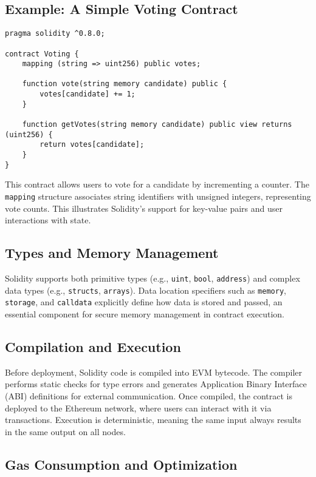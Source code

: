 \subsection*{Example: A Simple Voting Contract}
\begin{lstlisting}[language=Solidity, caption={A simple smart contract for voting system}, label={lst:voting_contract}, captionpos=b]
pragma solidity ^0.8.0;

contract Voting {
    mapping (string => uint256) public votes;

    function vote(string memory candidate) public {
        votes[candidate] += 1;
    }

    function getVotes(string memory candidate) public view returns (uint256) {
        return votes[candidate];
    }
}
\end{lstlisting}

This contract allows users to vote for a candidate by incrementing a counter. The \texttt{mapping} structure associates string identifiers with unsigned integers, representing vote counts. This illustrates Solidity's support for key-value pairs and user interactions with state.

\subsection*{Types and Memory Management}

Solidity supports both primitive types (e.g., \texttt{uint}, \texttt{bool}, \texttt{address}) and complex data types (e.g., \texttt{structs}, \texttt{arrays}). Data location specifiers such as \texttt{memory}, \texttt{storage}, and \texttt{calldata} explicitly define how data is stored and passed, an essential component for secure memory management in contract execution.

\subsection*{Compilation and Execution}

Before deployment, Solidity code is compiled into EVM bytecode. The compiler performs static checks for type errors and generates Application Binary Interface (ABI) definitions for external communication. Once compiled, the contract is deployed to the Ethereum network, where users can interact with it via transactions. Execution is deterministic, meaning the same input always results in the same output on all nodes.

\subsection*{Gas Consumption and Optimization}

